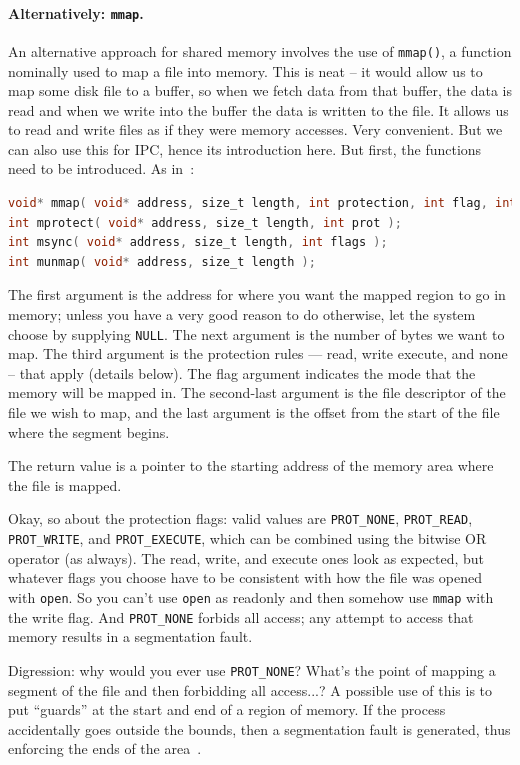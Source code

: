 \paragraph{Alternatively: \texttt{mmap}.} An alternative approach for shared memory involves the use of \texttt{mmap()}, a function nominally used to map a file into memory. This is neat -- it would allow us to map some disk file to a buffer, so when we fetch data from that buffer, the data is read and when we write into the buffer the data is written to the file. It allows us to read and write files as if they were memory accesses. Very convenient. But we can also use this for IPC, hence its introduction here. But first, the functions need to be introduced. As in~\cite{apunix}:

\begin{lstlisting}[language=C]
void* mmap( void* address, size_t length, int protection, int flag, int fd, off_t offset );
int mprotect( void* address, size_t length, int prot );
int msync( void* address, size_t length, int flags );
int munmap( void* address, size_t length );
\end{lstlisting}

The first argument is the address for where you want the mapped region to go in memory; unless you have a very good reason to do otherwise, let the system choose by supplying \texttt{NULL}. The next argument is the number of bytes we want to map. The third argument is the protection rules --- read, write execute, and none -- that apply (details below). The flag argument indicates the mode that the memory will be mapped in. The second-last argument is the file descriptor of the file we wish to map, and the last argument is the offset from the start of the file where the segment begins.

The return value is a pointer to the starting address of the memory area where the file is mapped.

Okay, so about the protection flags: valid values are \texttt{PROT\_NONE}, \texttt{PROT\_READ}, \texttt{PROT\_WRITE}, and \texttt{PROT\_EXECUTE}, which can be combined using the bitwise OR operator (as always). The read, write, and execute ones look as expected, but whatever flags you choose have to be consistent with how the file was opened with \texttt{open}. So you can't use \texttt{open} as readonly and then somehow use \texttt{mmap} with the write flag. And \texttt{PROT\_NONE} forbids all access; any attempt to access that memory results in a segmentation fault.

Digression: why would you ever use \texttt{PROT\_NONE}? What's the point of mapping a segment of the file and then forbidding all access...?  A possible use of this is to put ``guards'' at the start and end of a region of memory. If the process accidentally goes outside the bounds, then a segmentation fault is generated, thus enforcing the ends of the area~\cite{lpi}.


